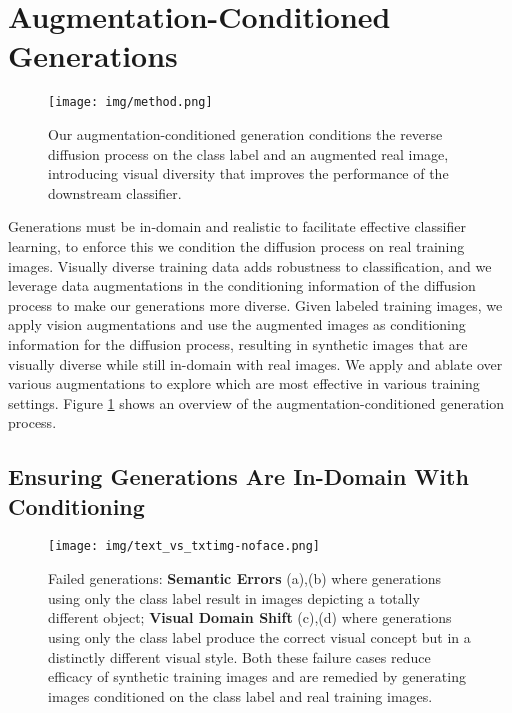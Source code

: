 \section{Augmentation-Conditioned Generations}

\begin{figure}[ht!]
    \centering
    \texttt{[image: img/method.png]}
    \vspace{-0.5cm}
    \caption{Our augmentation-conditioned generation conditions the reverse diffusion process on the class label and an augmented real image, introducing visual diversity that improves the performance of the downstream classifier. }
    \label{fig:method}
     \vspace{-0.4cm}
\end{figure}

\vspace{-0.2cm}
Generations must be in-domain and realistic to facilitate effective classifier learning, to enforce this we condition the diffusion process on real training images. 
Visually diverse training data adds robustness to classification, and we leverage data augmentations in the conditioning information of the diffusion process to make our generations more diverse. 
Given labeled training images, we apply vision augmentations and use the augmented images as conditioning information for the diffusion process, resulting in synthetic images that are visually diverse while still in-domain with real images. 
We apply and ablate over various augmentations to explore which are most effective in various training settings. 
Figure \ref{fig:method} shows an overview of the augmentation-conditioned generation process.
\vspace{-0.2cm}

\subsection{Ensuring Generations Are In-Domain With Conditioning} \label{sec:in_domain}
\vspace{-0.2cm}

\begin{figure}[b]
    \vspace{-0.3cm}
    \centering
    \texttt{[image: img/text\_vs\_txtimg-noface.png]}
    \vspace{-0.4cm}
    \caption{Failed generations: \textbf{Semantic Errors} (a),(b) where generations using only the class label result in images depicting a totally different object; \textbf{Visual Domain Shift} (c),(d) where generations using only the class label produce the correct visual concept but in a distinctly different visual style. Both these failure cases reduce efficacy of synthetic training images and are remedied by generating images conditioned on the class label and real training images.}
    \label{fig:fail_gens}
     \vspace{-0.3cm}
\end{figure}

